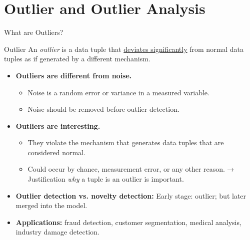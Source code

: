 \section{Outlier and Outlier Analysis}


\begin{frame}{What are Outliers?}
	\begin{block}{Outlier}
		An \textit{outlier} is a data tuple that \underline{deviates significantly} from normal data tuples as if generated by a different mechanism.
	\end{block}

	\begin{itemize}
		\item \textbf{Outliers are \textcolor{faugray}{different from noise}.}
		      \begin{itemize}
			      \item Noise is a random error or variance in a measured variable.
			      \item Noise should be removed before outlier detection.
		      \end{itemize}
		\item \textbf{Outliers are \textcolor{faugray}{interesting}.}
		      \begin{itemize}
			      \item They violate the mechanism that generates data tuples that are considered normal.
			      \item Could occur by chance, measurement error, or any other reason.\newline $\rightarrow$ Justification \textit{why} a tuple is an outlier is important.
		      \end{itemize}
		\item \textbf{Outlier detection vs. novelty detection:} Early stage: outlier; but later merged into the model.
		\item \textbf{Applications:} fraud detection, customer segmentation, medical analysis, industry damage detection.
	\end{itemize}

\end{frame}

